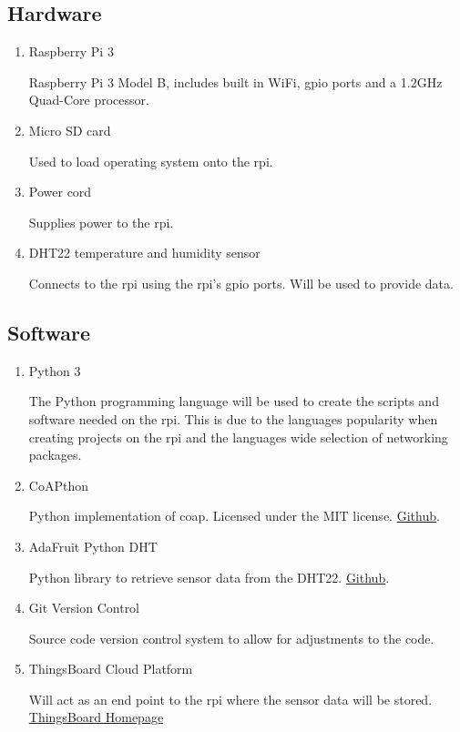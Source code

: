 \subsection{Hardware}
\begin{enumerate}
    \item Raspberry Pi 3

        Raspberry Pi 3 Model B, includes built in WiFi, \gls{gpio} ports and a 1.2GHz Quad-Core processor.
    \item Micro SD card
    
        Used to load operating system onto the \gls{rpi}.
    \item Power cord
    
        Supplies power to the \gls{rpi}.
    \item DHT22 temperature and humidity sensor
    
        Connects to the \gls{rpi} using the \gls{rpi}'s \gls{gpio} ports. Will be used to provide data.

\end{enumerate}

\subsection{Software}
\begin{enumerate}
    \item Python 3

        The Python programming language will be used to create the scripts and software needed on the \gls{rpi}.
        This is due to the languages popularity when creating projects on the \gls{rpi} and the languages wide selection
        of networking packages.
    \item CoAPthon
    
        Python implementation of \gls{coap}. Licensed under the MIT license. \href{https://github.com/Tanganelli/CoAPthon}{Github}.

    \item AdaFruit Python DHT
        
        Python library to retrieve sensor data from the DHT22. \href{https://github.com/adafruit/Adafruit_Python_DHT}{Github}.

    \item Git Version Control
    
        Source code version control system to allow for adjustments to the code.

    \item ThingsBoard Cloud Platform
    
        Will act as an end point to the \gls{rpi} where the sensor data will be stored. \href{https://thingsboard.io}{ThingsBoard Homepage}
\end{enumerate}